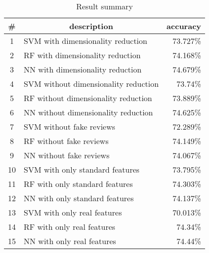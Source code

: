 \begin{table}[h!]
    \centering
    \begin{tabular}{c|lr}
        \rowcolor[HTML]{EEEEEE} 
        \textbf{\#} & \multicolumn{1}{c}{\cellcolor[HTML]{EEEEEE}\textbf{description}} & \textbf{accuracy} \\ \hline
        \rowcolor[HTML]{EEEEEE} 
        1           & SVM with dimensionality reduction                                & 73.727\%          \\
        \rowcolor[HTML]{EEEEEE} 
        2           & RF with dimensionality reduction                                 & 74.168\%          \\
        \rowcolor[HTML]{E1E1E1} 
        3           & NN with dimensionality reduction                                 & 74.679\%          \\ \hline
        \rowcolor[HTML]{EEEEEE} 
        4           & SVM without dimensionality reduction                             & 73.74\%           \\
        \rowcolor[HTML]{EEEEEE} 
        5           & RF without dimensionality reduction                              & 73.889\%          \\
        \rowcolor[HTML]{EEEEEE} 
        6           & NN without dimensionality reduction                              & 74.625\%          \\ \hline
        \rowcolor[HTML]{EEEEEE} 
        7           & SVM without fake reviews                                         & 72.289\%          \\
        \rowcolor[HTML]{EEEEEE} 
        8           & RF without fake reviews                                          & 74.149\%          \\
        \rowcolor[HTML]{EEEEEE} 
        9           & NN without fake reviews                                          & 74.067\%          \\ \hline
        \rowcolor[HTML]{EEEEEE} 
        10          & SVM with only standard features                                  & 73.795\%          \\
        \rowcolor[HTML]{EEEEEE} 
        11          & RF with only standard features                                   & 74.303\%          \\
        \rowcolor[HTML]{EEEEEE} 
        12          & NN with only standard features                                   & 74.137\%          \\ \hline
        \rowcolor[HTML]{EEEEEE} 
        13          & SVM with only real features                                      & 70.013\%          \\
        \rowcolor[HTML]{EEEEEE} 
        14          & RF with only real features                                       & 74.34\%           \\
        \rowcolor[HTML]{EEEEEE} 
        15          & NN with only real features                                       & 74.44\%          
    \end{tabular}
    \caption{Result summary}
    \label{tab:res-summary}
\end{table}

